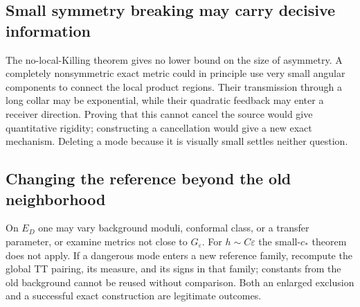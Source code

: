 \documentclass[a4paper,11pt]{article}
\theoremstyle{definition}
\begin{document}
\subsection{Small symmetry breaking may carry decisive information}\label{sec:small-asymmetry}
The no-local-Killing theorem gives no lower bound on the size of
asymmetry. A completely nonsymmetric exact metric could in principle
use very small angular components to connect the local product regions.
Their transmission through a long collar may be exponential, while
their quadratic feedback may enter a receiver direction. Proving that
this cannot cancel the source would give quantitative rigidity;
constructing a cancellation would give a new exact mechanism.
Deleting a mode because it is visually small settles neither question.

\subsection{Changing the reference beyond the old neighborhood}\label{sec:beyond-ball}
On $E_D$ one may vary background moduli, conformal class, or a transfer
parameter, or examine metrics not close to $G_\varepsilon$.
For $h\sim C\varepsilon$ the small-$c_*$ theorem does not apply.
If a dangerous mode enters a new reference family, recompute the
global TT pairing, its measure, and its signs in that family; constants
from the old background cannot be reused without comparison.
Both an enlarged exclusion and a successful exact construction are
legitimate outcomes.
\end{document}
